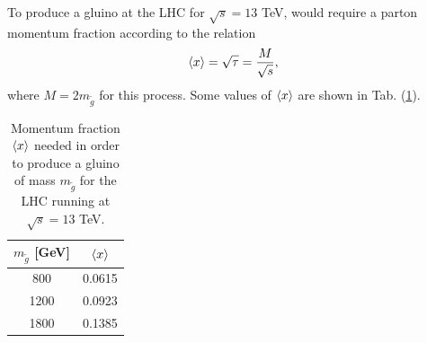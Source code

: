 \documentclass[11pt]{article}
\begin{document}
\begin{flushleft}
To produce a gluino at the LHC for $\sqrt{s}=13$ TeV, would require a parton momentum fraction according to the relation
\begin{align*}
\braket{x} = \sqrt{\tau} = \frac{M}{\sqrt{s}},
\end{align*}
where $M= 2m_{\tilde{g}}$ for this process. Some values of $\braket{x}$ are shown in Tab. (\ref{tab:: momentum fractions x}).
\begin{table}[H]
\centering
\begin{tabular}{|c|c|}
\hline
$m_{\tilde{g}}$ [GeV] & $\braket{x}$\\
\hline
800 & 0.0615\\
1200 & 0.0923\\
1800 & 0.1385
\\
\hline
\end{tabular}
\caption{Momentum fraction $\braket{x}$ needed in order to produce a gluino of mass $m_{\tilde{g}}$ for the LHC running at $\sqrt{s}=13$ TeV.}
\label{tab:: momentum fractions x}
\end{table}
\end{flushleft}
\end{document}
